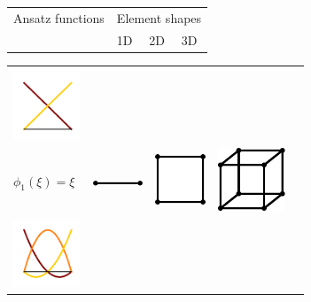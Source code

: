 \begin{table}
  \centering%
  \begin{tabular}{|ll|lll|}
    \hline
    \multicolumn{2}{|l|}{Ansatz functions} \hspace*{43.82mm} & \multicolumn{3}{l|}{Element shapes}  \\
                                         && 1D \hspace*{11mm} & 2D \hspace*{11mm}& 3D\hspace*{11.75mm}\\
    \hline
  \end{tabular}
  \begin{tabular}{|ll|lll|}
    \vspace*{-5mm}
      &&&&\\
      \includegraphics[width=2cm]{images/implementation/ansatz1.pdf}&
      \begin{minipage}{5cm}
        \vspace{-2cm}
        $\phi_0(\xi) = 1-\xi$,\\[2mm] 
        $\phi_1(\xi) = \xi$
      \end{minipage}
       &
      \includegraphics[width=15mm]{images/implementation/ansatz_mesh_1.pdf} & 
      \includegraphics[width=15mm]{images/implementation/ansatz_mesh_2.pdf} &
      \includegraphics[width=2cm]{images/implementation/ansatz_mesh_3.pdf} \\
    \hline
      \includegraphics[width=2cm]{images/implementation/ansatz2.pdf}&

\end{tabular}
\end{table}

